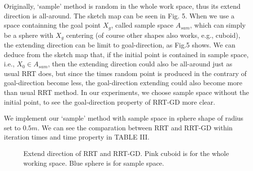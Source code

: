 \documentclass[letterpaper, 10 pt, conference]{ieeeconf}  %
\begin{document}
Originally, `sample' method is random in the whole work space, thus its extend direction is all-around. The sketch map can be seen in Fig. 5. When we use a space containning the goal point $X_{g}$, called sample space $A_{sam}$, which can simply be a sphere with $X_{g}$ centering (of course other shapes also works, e.g., cuboid), the extending direction can be limit to goal-direction, as Fig.5 shows. We can deduce from the sketch map that, if the initial point is contained in sample space, i.e., $X_{0}\in A_{sam}$, then the extending direction could also be all-around just as usual RRT does, but since the times random point is produced in the contrary of goal-direction become less, the goal-direction extending could also become more than usual RRT method. In our experiments, we choose sample space without the initial point, to see the goal-direction property of RRT-GD more clear.

We implement our `sample' method with sample space in sphere shape of radius set to $0.5m$. We can see the comparation between RRT and RRT-GD within iteration times and time property in TABLE III.

\begin{figure}[thpb]
      \centering
      \caption{Extend direction of RRT and RRT-GD. Pink cuboid is for the whole working space. Blue sphere is for sample space. }
      \label{figurelabe5}
\end{figure}
\end{document}
